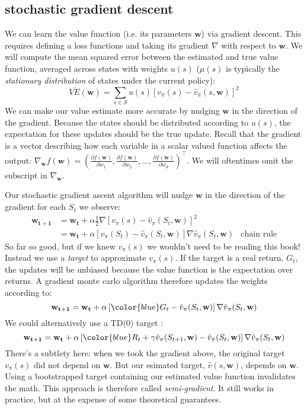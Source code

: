 \subsection{stochastic gradient descent}
We can learn the value function (i.e. its parameters $\mathbf{w}$) via gradient descent. This requires defining a loss functions and taking its gradient $\nabla$ with respect to $\mathbf{w}$. We will compute the mean squared error between the estimated and true value function, averaged across states with weights $u(s)$ ($\mu(s)$ is typically the \textit{stationary distribution} of states under the current policy):
$$
\overline{VE}(\mathbf{w}) = \sum_{s \in \mathcal{S}} u(s) \left[v_\pi(s) - \hat{v}_\pi(s, \mathbf{w})\right]^2
$$
We can make our value estimate more accurate by nudging $\mathbf{w}$ in the direction of the gradient. Because the states should be distributed according to $u(s)$, the expectation for these updates should be the true update. Recall that the gradient is a vector describing how each variable in a scalar valued function affects the output: $\nabla_\mathbf{w} f(\mathbf{w}) = \left( \frac{\partial f(\mathbf{w})}{\partial w_1}, \frac{\partial f(\mathbf{w})}{\partial w_2}, \dots, \frac{\partial f(\mathbf{w})}{\partial w_d} \right)^\top$. We will oftentimes omit the subscript in $\nabla_\mathbf{w}$.

Our stochastic gradient ascent algorithm will nudge $\mathbf{w}$ in the direction of the gradient for each $S_t$ we observe:
\begin{align*}
\mathbf{w_{t+1}} &= \mathbf{w_{t}} + \alpha \frac{1}{2} \nabla \left[v_\pi(s) - \hat{v}_\pi(S_t, \mathbf{w})\right]^2 \\
&= \mathbf{w_{t}} + \alpha \left[{v_\pi(S_{t})} - \hat{v}_\pi(S_t, \mathbf{w})\right] \nabla \hat{v}_\pi(S_t, \mathbf{w}) & \scriptstyle{\text{chain rule}}
\end{align*}
So far so good, but if we knew $v_\pi(s)$ we wouldn't need to be reading this book! Instead we use a \textit{target} to approximate $v_\pi(s)$. If the target is a real return, $G_t$, the updates will be unbiased because the value function is the expectation over returns. A gradient monte carlo algorithm therefore updates the weights according to:
$$ \mathbf{w_{t+1}} = \mathbf{w_{t}} + \alpha \left[{\color{blue}G_t} - \hat{v}_\pi(S_t, \mathbf{w})\right] \nabla \hat{v}_\pi(S_t, \mathbf{w}) $$
We could alternatively use a TD(0) target :
$$ \mathbf{w_{t+1}} = \mathbf{w_{t}} + \alpha \left[{\color{blue}R_t + \gamma \hat{v}_\pi(S_{t+1}, \mathbf{w})} - \hat{v}_\pi(S_t, \mathbf{w})\right] \nabla \hat{v}_\pi(S_t, \mathbf{w}) $$
There's a subtlety here: when we took the gradient above, the original target $v_\pi(s)$ did not depend on $\mathbf{w}$. But our esimated target, $\hat{v}(s, \mathbf{w})$, depends on $\mathbf{w}$. Using a bootstrapped target containing our estimated value function invalidates the math. This approach is therefore called \textit{semi-gradient}. It still works in practice, but at the expense of some theoretical guarantees.

